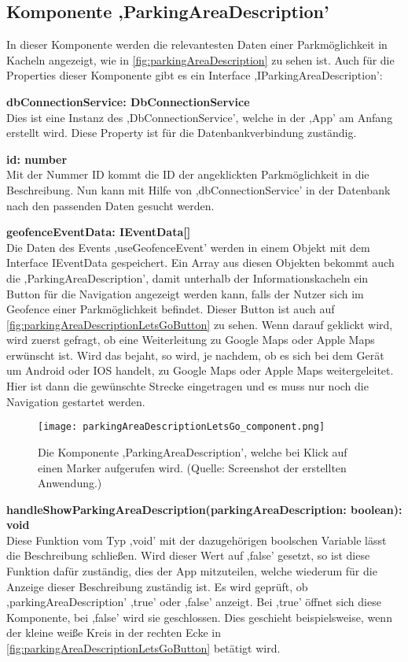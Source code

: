 \subsection{Komponente ,ParkingAreaDescription'}
\label{handleFunctions}
In dieser Komponente werden die relevantesten Daten einer Parkmöglichkeit in Kacheln angezeigt, wie in \autoref{fig:parkingAreaDescription} zu sehen ist. Auch für die Properties dieser Komponente gibt es ein Interface ,IParkingAreaDescription':
\begin{description}
	\item \textbf{dbConnectionService: DbConnectionService} \\ Dies ist eine Instanz des ,DbConnectionService', welche in der ,App' am Anfang erstellt wird. Diese Property ist für die Datenbankverbindung zuständig.
	\item \textbf{id: number} \\ Mit der Nummer ID kommt die ID der angeklickten Parkmöglichkeit in die Beschreibung. Nun kann mit Hilfe von ,dbConnectionService' in der Datenbank nach den passenden Daten gesucht werden.
	\item \textbf{geofenceEventData: IEventData[]} \\ Die Daten des Events ,useGeofenceEvent' werden in einem Objekt mit dem Interface IEventData gespeichert. Ein Array aus diesen Objekten bekommt auch die ,ParkingAreaDescription', damit unterhalb der Informationskacheln ein Button für die Navigation angezeigt werden kann, falls der Nutzer sich im Geofence einer Parkmöglichkeit befindet. Dieser Button ist auch auf \autoref{fig:parkingAreaDescriptionLetsGoButton} zu sehen. Wenn darauf geklickt wird, wird zuerst gefragt, ob eine Weiterleitung zu Google Maps oder Apple Maps erwünscht ist. Wird das bejaht, so wird, je nachdem, ob es sich bei dem Gerät um Android oder IOS handelt, zu Google Maps oder Apple Maps weitergeleitet. Hier ist dann die gewünschte Strecke eingetragen und es muss nur noch die Navigation gestartet werden.
	\begin{figure}[h!]
		\centering
		\texttt{[image: parkingAreaDescriptionLetsGo\_component.png]}
		\caption[Die Komponente ,ParkingAreaDescription', welche bei Klick auf einen Marker aufgerufen wird.]
		{Die Komponente ,ParkingAreaDescription', welche bei Klick auf einen Marker aufgerufen wird. (Quelle: Screenshot der erstellten Anwendung.)}
		\label{fig:parkingAreaDescriptionLetsGoButton}
	\end{figure}
	\item \textbf{handleShowParkingAreaDescription(parkingAreaDescription: boolean): void} \\ Diese Funktion vom Typ ,void' mit der dazugehörigen boolschen Variable lässt die Beschreibung schließen. Wird dieser Wert auf ,false' gesetzt, so ist diese Funktion dafür zuständig, dies der App mitzuteilen, welche wiederum für die Anzeige dieser Beschreibung zuständig ist. Es wird geprüft, ob ,parkingAreaDescription' ,true' oder ,false' anzeigt. Bei ,true' öffnet sich diese Komponente, bei ,false' wird sie geschlossen. Dies geschieht beispielsweise, wenn der kleine weiße Kreis in der rechten Ecke in \autoref{fig:parkingAreaDescriptionLetsGoButton} betätigt wird.

\end{description}
